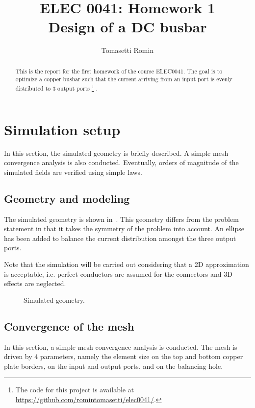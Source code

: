 \documentclass[10pt,a4paper]{article}
\title{%
    ELEC 0041: Homework 1\\
    \large Design of a DC busbar
}
\author{Tomasetti Romin}
\begin{document}
\maketitle

\begin{abstract}
    This is the report for the first homework of the course ELEC0041.
    The goal is to optimize a copper busbar such that the current arriving from an input port
    is evenly distributed to 3 output ports
    \footnote{The code for this project is available at \url{https://github.com/romintomasetti/elec0041/}.}
    .
\end{abstract}

\section{Simulation setup}

In this section, the simulated geometry is briefly described.
A simple mesh convergence analysis is also conducted.
Eventually, orders of magnitude of the simulated fields are verified using simple laws.

\subsection{Geometry and modeling}

The simulated geometry is shown in~.
This geometry differs from the problem statement in that it takes the symmetry of the problem into account.
An ellipse has been added to balance the current distribution amongst the three output ports.

Note that the simulation will be carried out considering that a 2D approximation is acceptable, i.e.
perfect conductors are assumed for the connectors and 3D effects are neglected.

\begin{figure}[h]
    \centering
    
    \caption{Simulated geometry.}
    \label{figure:geometry}
\end{figure}

\subsection{Convergence of the mesh}

In this section, a simple mesh convergence analysis is conducted.
The mesh is driven by 4 parameters, namely the element size on the top and bottom copper plate borders,
on the input and output ports, and on the balancing hole.
\end{document}
